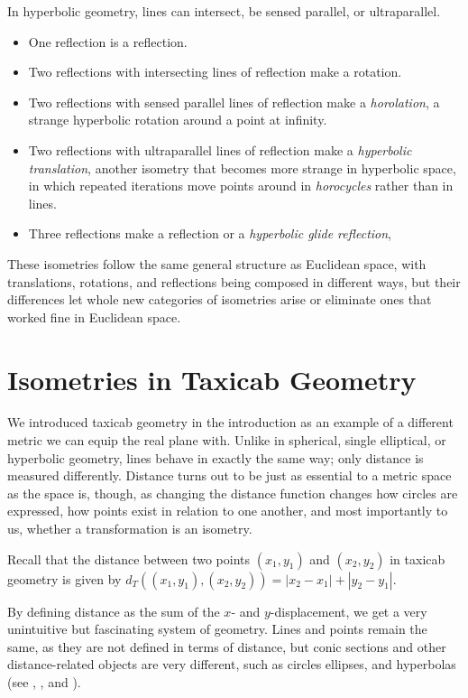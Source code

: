 \documentclass{mystyle}
\begin{document}
In hyperbolic geometry, lines can intersect, be sensed parallel, or ultraparallel.
\begin{itemize}
    \item One reflection is a reflection.
    \item Two reflections with intersecting lines of reflection make a rotation.
    \item Two reflections with sensed parallel lines of reflection make a \textit{horolation}, a strange hyperbolic rotation around a point at infinity. 
    \item Two reflections with ultraparallel lines of reflection make a \textit{hyperbolic translation}, another isometry that becomes more strange in hyperbolic space, in which repeated iterations move points around in \textit{horocycles} rather than in lines.
    \item Three reflections make a reflection or a \textit{hyperbolic glide reflection}, 
\end{itemize}

These isometries follow the same general structure as Euclidean space, with translations, rotations, and reflections being composed in different ways, but their differences let whole new categories of isometries arise or eliminate ones that worked fine in Euclidean space.

\section{Isometries in Taxicab Geometry}\label{sec_four}
We introduced taxicab geometry in the introduction as an example of a different metric we can equip the real plane with. Unlike in spherical, single elliptical, or hyperbolic geometry, lines behave in exactly the same way; only distance is measured differently. Distance turns out to be just as essential to a metric space as the space is, though, as changing the distance function changes how circles are expressed, how points exist in relation to one another, and most importantly to us, whether a transformation is an isometry. 

Recall that the distance between two points $(x_1, y_1)$ and $(x_2, y_2)$ in taxicab geometry is given by $d_T((x_1, y_1), (x_2, y_2)) = |x_2-x_1| + |y_2-y_1|$. 

By defining distance as the sum of the $x$- and $y$-displacement, we get a very unintuitive but fascinating system of geometry. Lines and points remain the same, as they are not defined in terms of distance, but conic sections and other distance-related objects are very different, such as circles ellipses, and hyperbolas (see , , and ).
\end{document}
